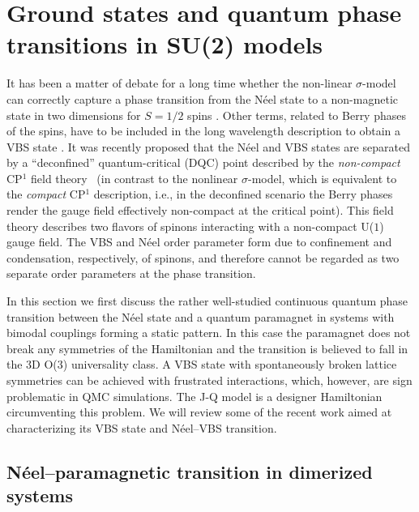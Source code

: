 \documentclass[range]{ar2e}
\begin{document}
\section{Ground states and quantum phase transitions in SU(2) models}
\label{sec:su2models}

It has been a matter of debate for a long time whether the non-linear $\sigma$-model can correctly capture a phase transition from the N\'eel state 
to a non-magnetic state in two dimensions for $S=1/2$ spins \cite{Chakravarty89}. Other terms, related to Berry phases of the spins, have to be included in the long wavelength description to obtain a VBS state \cite{Read90,murthy1990:mono}. It was recently proposed that the N\'eel and VBS states are separated
by a ``deconfined'' quantum-critical (DQC) point \cite{Senthil04a} described by the {\it non-compact} CP$^1$ field theory~\cite{Motrunich04} (in contrast to the nonlinear 
$\sigma$-model, which is equivalent to the {\it compact} CP$^1$ description, i.e., in the deconfined scenario the Berry phases render the gauge field effectively
non-compact at the critical point).
This field theory describes two flavors of spinons interacting with a non-compact U($1$) gauge field.  The VBS and N\'eel order parameter form due to confinement and condensation, 
respectively, of spinons, and therefore cannot be regarded as two separate order parameters at the phase transition.

In this section we first discuss the rather well-studied continuous quantum phase transition between the N\'eel state and a quantum paramagnet in systems 
with bimodal couplings forming a static pattern. In this case the paramagnet does not break any symmetries of the Hamiltonian and the transition 
is believed to fall in the 3D O($3$) universality class. A VBS state with spontaneously broken lattice symmetries can be achieved with frustrated 
interactions, which, however, are sign problematic in QMC simulations. The J-Q model \cite{Sandvik07} is a designer Hamiltonian circumventing this 
problem. We will review some of the recent work aimed at characterizing its VBS state and  N\'eel--VBS transition.

\subsection{N\'eel--paramagnetic transition in dimerized systems}
\label{sec:dimermodels}
\end{document}
